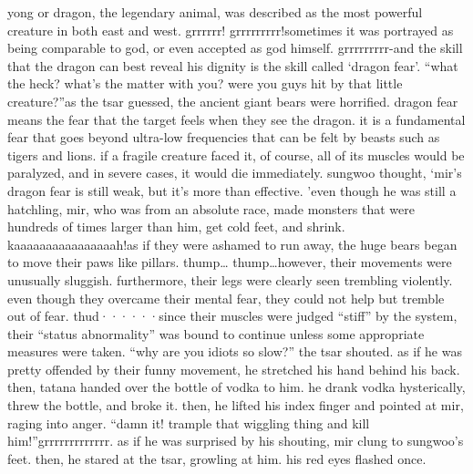 yong or dragon, the legendary animal, was described as the most powerful creature in both east and west.
grrrrrr! grrrrrrrrr!sometimes it was portrayed as being comparable to god, or even accepted as god himself.
grrrrrrrrr-and the skill that the dragon can best reveal his dignity is the skill called ‘dragon fear’.
“what the heck? what’s the matter with you? were you guys hit by that little creature?”as the tsar guessed, the ancient giant bears were horrified.
dragon fear means the fear that the target feels when they see the dragon.
it is a fundamental fear that goes beyond ultra-low frequencies that can be felt by beasts such as tigers and lions.
 if a fragile creature faced it, of course, all of its muscles would be paralyzed, and in severe cases, it would die immediately.
sungwoo thought, ‘mir’s dragon fear is still weak, but it’s more than effective.
’even though he was still a hatchling, mir, who was from an absolute race, made monsters that were hundreds of times larger than him, get cold feet, and shrink.
kaaaaaaaaaaaaaaaah!as if they were ashamed to run away, the huge bears began to move their paws like pillars.
thump… thump…however, their movements were unusually sluggish.
 furthermore, their legs were clearly seen trembling violently.
 even though they overcame their mental fear, they could not help but tremble out of fear.
thud······since their muscles were judged “stiff” by the system, their “status abnormality” was bound to continue unless some appropriate measures were taken.
“why are you idiots so slow?” the tsar shouted.
as if he was pretty offended by their funny movement, he stretched his hand behind his back.
 then, tatana handed over the bottle of vodka to him.
 he drank vodka hysterically, threw the bottle, and broke it.
 then, he lifted his index finger and pointed at mir, raging into anger.
“damn it! trample that wiggling thing and kill him!”grrrrrrrrrrrrr.
as if he was surprised by his shouting, mir clung to sungwoo’s feet.
 then, he stared at the tsar, growling at him.
 his red eyes flashed once.


 